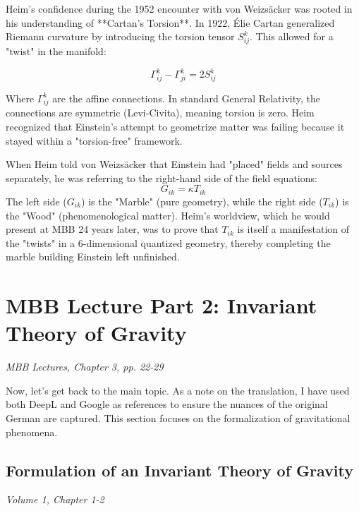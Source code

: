 \documentclass[11pt,a4paper,oneside]{article}
\begin{document}
Heim's confidence during the 1952 encounter with von Weizsäcker was rooted in his understanding of **Cartan's Torsion**. In 1922, Élie Cartan generalized Riemann curvature by introducing the torsion tensor $S_{ij}^k$. This allowed for a "twist" in the manifold:

\begin{equation}
    \Gamma_{ij}^k - \Gamma_{ji}^k = 2 S_{ij}^k
\end{equation}

Where $\Gamma_{ij}^k$ are the affine connections. In standard General Relativity, the connections are symmetric (Levi-Civita), meaning torsion is zero. Heim recognized that Einstein's attempt to geometrize matter was failing because it stayed within a "torsion-free" framework. 

When Heim told von Weizsäcker that Einstein had "placed" fields and sources separately, he was referring to the right-hand side of the field equations:
\begin{equation}
    G_{ik} = \kappa T_{ik}
\end{equation}
The left side ($G_{ik}$) is the "Marble" (pure geometry), while the right side ($T_{ik}$) is the "Wood" (phenomenological matter). Heim’s worldview, which he would present at MBB 24 years later, was to prove that $T_{ik}$ is itself a manifestation of the "twists" in a 6-dimensional quantized geometry, thereby completing the marble building Einstein left unfinished.
\section{MBB Lecture Part 2: Invariant Theory of Gravity}
\textit{MBB Lectures, Chapter 3, pp. 22-29}

Now, let's get back to the main topic. As a note on the translation, I have used both DeepL and Google as references to ensure the nuances of the original German are captured. This section focuses on the formalization of gravitational phenomena.

\subsection{Formulation of an Invariant Theory of Gravity}
\textit{Volume 1, Chapter 1-2}
\end{document}
